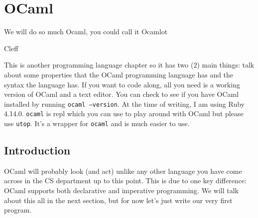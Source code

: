 \documentclass[main.tex]{subfiles}
\begin{document}
\chapter{OCaml}
\epigraph{We will do so much Ocaml, you could call it Ocamlot}{Cleff}

This is another programming language chapter so it has two (2) main things: talk about some properties that the OCaml programming language has and the syntax the language has. If you want to code along, all you need is a working version of OCaml and a text editor. You can check to see if you have OCaml installed by running \texttt{ocaml --version}. At the time of writing, I am using Ruby 4.14.0. 
\texttt{ocaml} is repl which you can use to play around with OCaml but please use \texttt{utop}. It's a wrapper for \texttt{ocaml} and is much easier to use.  

\section{Introduction}

OCaml will probably look (and act) unlike any other language you have come across in the CS department up to this point. This is due to one key difference: OCaml supports both declarative and imperative programming. We will talk about this all in the next section, but for now let's just write our very first program.
\end{document}
